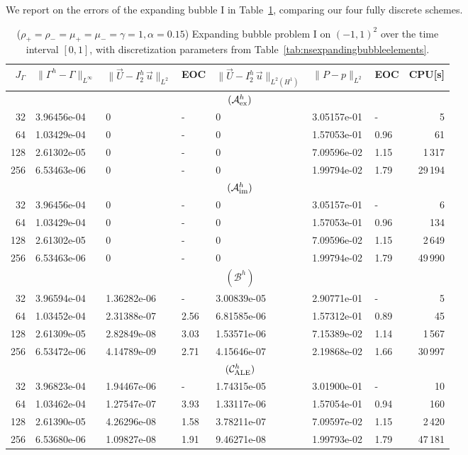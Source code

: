 \documentclass[a4paper,12pt,onecolumn]{article}
\newcommand{\errorXx}{\|\Gamma^h - \Gamma\|_{L^\infty}}
\newcommand{\LerrorUu}[1]{\|\vec U - I^h_{#1}\,\vec u\|_{L^2}}
\newcommand{\HerrorUu}[1]{\|\vec U - I^h_{#1}\,\vec u\|_{L^2(H^1)}}
\newcommand{\LerrorPp}{\|P - p\|_{L^2}}
\newcommand{\schemeAex}{{\mathcal{A}^h_{\rm ex}}}
\newcommand{\schemeAim}{{\mathcal{A}^h_{\rm im}}}
\newcommand{\schemeB}{{\mathcal{B}^h}}
\newcommand{\schemeALE}{{\mathcal{C}^h_{\rm ALE}}}
\begin{document}
We report on the errors of the expanding bubble I in
Table~\ref{tab:nsexpandingbubbleIp2p1p0}, comparing our four fully discrete
schemes.
\begin{table}
\center
\hspace*{-3.25cm}
\begin{tabular}{rllllllr}
\hline
$J_\Gamma$ & $\errorXx$ & $\LerrorUu2$ & EOC & $\HerrorUu2$ & $\LerrorPp$ & EOC
& CPU[s] \\
\hline
& \multicolumn{7}{c}{$(\schemeAex)$} \\
\hline
 32 & 3.96456e-04 & 0 & - & 0 & 3.05157e-01 &    - &     5 \\
 64 & 1.03429e-04 & 0 & - & 0 & 1.57053e-01 & 0.96 &    61 \\
128 & 2.61302e-05 & 0 & - & 0 & 7.09596e-02 & 1.15 &  1\,317 \\
256 & 6.53463e-06 & 0 & - & 0 & 1.99794e-02 & 1.79 & 29\,194 \\
\hline
& \multicolumn{7}{c}{$(\schemeAim)$} \\
\hline
 32 & 3.96456e-04 & 0 & - & 0 & 3.05157e-01 &    - &     6 \\
 64 & 1.03429e-04 & 0 & - & 0 & 1.57053e-01 & 0.96 &   134 \\
128 & 2.61302e-05 & 0 & - & 0 & 7.09596e-02 & 1.15 &  2\,649 \\
256 & 6.53463e-06 & 0 & - & 0 & 1.99794e-02 & 1.79 & 49\,990 \\
\hline
& \multicolumn{7}{c}{$(\schemeB)$} \\
\hline
 32 & 3.96594e-04 & 1.36282e-06 &    - & 3.00839e-05 & 2.90771e-01 &    - &
5 \\
 64 & 1.03452e-04 & 2.31388e-07 & 2.56 & 6.81585e-06 & 1.57312e-01 & 0.89 &
45 \\
128 & 2.61309e-05 & 2.82849e-08 & 3.03 & 1.53571e-06 & 7.15389e-02 & 1.14 &
1\,567 \\
256 & 6.53472e-06 & 4.14789e-09 & 2.71 & 4.15646e-07 & 2.19868e-02 & 1.66 &
30\,997 \\
\hline
& \multicolumn{7}{c}{$(\schemeALE)$} \\
\hline
 32 & 3.96823e-04 & 1.94467e-06 &    - & 1.74315e-05 & 3.01900e-01 &    - &
10 \\
 64 & 1.03462e-04 & 1.27547e-07 & 3.93 & 1.33117e-06 & 1.57054e-01 & 0.94 &
160 \\
128 & 2.61390e-05 & 4.26296e-08 & 1.58 & 3.78211e-07 & 7.09597e-02 & 1.15 &
2\,420 \\
256 & 6.53680e-06 & 1.09827e-08 & 1.91 & 9.46271e-08 & 1.99793e-02 & 1.79 &
47\,181 \\
\hline
\end{tabular}
\hspace*{-3.25cm}
\caption[Navier--Stokes expanding bubble I errors]
{($\rho_+ = \rho_- = \mu_+ = \mu_- = \gamma = 1,\alpha=0.15$)
Expanding bubble problem I on $(-1,1)^2$ over the time interval $[0,1]$, with
discretization parameters from Table~\ref{tab:nsexpandingbubbleelements}.}
\label{tab:nsexpandingbubbleIp2p1p0}
\end{table}
\end{document}
